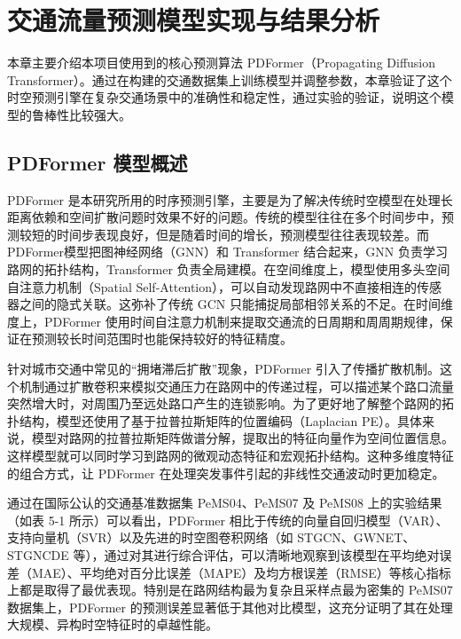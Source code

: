 \chapter{交通流量预测模型实现与结果分析}

本章主要介绍本项目使用到的核心预测算法 PDFormer（Propagating Diffusion Transformer）。通过在构建的交通数据集上训练模型并调整参数，本章验证了这个时空预测引擎在复杂交通场景中的准确性和稳定性，通过实验的验证，说明这个模型的鲁棒性比较强大。

\section{PDFormer 模型概述}

PDFormer 是本研究所用的时序预测引擎，主要是为了解决传统时空模型在处理长距离依赖和空间扩散问题时效果不好的问题。传统的模型往往在多个时间步中，预测较短的时间步表现良好，但是随着时间的增长，预测模型往往表现较差。而PDFormer模型把图神经网络（GNN）和 Transformer 结合起来，GNN 负责学习路网的拓扑结构，Transformer 负责全局建模。在空间维度上，模型使用多头空间自注意力机制（Spatial Self-Attention），可以自动发现路网中不直接相连的传感器之间的隐式关联。这弥补了传统 GCN 只能捕捉局部相邻关系的不足。在时间维度上，PDFormer 使用时间自注意力机制来提取交通流的日周期和周周期规律，保证在预测较长时间范围时也能保持较好的特征精度。

针对城市交通中常见的“拥堵滞后扩散”现象，PDFormer 引入了传播扩散机制。这个机制通过扩散卷积来模拟交通压力在路网中的传递过程，可以描述某个路口流量突然增大时，对周围乃至远处路口产生的连锁影响。为了更好地了解整个路网的拓扑结构，模型还使用了基于拉普拉斯矩阵的位置编码（Laplacian PE）。具体来说，模型对路网的拉普拉斯矩阵做谱分解，提取出的特征向量作为空间位置信息。这样模型就可以同时学习到路网的微观动态特征和宏观拓扑结构。这种多维度特征的组合方式，让 PDFormer 在处理突发事件引起的非线性交通波动时更加稳定。

通过在国际公认的交通基准数据集 PeMS04、PeMS07 及 PeMS08 上的实验结果（如表 5-1 所示）可以看出，PDFormer 相比于传统的向量自回归模型（VAR）、支持向量机（SVR）以及先进的时空图卷积网络（如 STGCN、GWNET、STGNCDE 等），通过对其进行综合评估，可以清晰地观察到该模型在平均绝对误差（MAE）、平均绝对百分比误差（MAPE）及均方根误差（RMSE）等核心指标上都是取得了最优表现。特别是在路网结构最为复杂且采样点最为密集的 PeMS07 数据集上，PDFormer 的预测误差显著低于其他对比模型，这充分证明了其在处理大规模、异构时空特征时的卓越性能。


